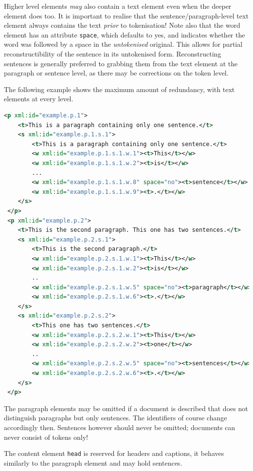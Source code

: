 \documentclass[a4paper,12pt]{report}
\begin{document}
Higher level elements \emph{may} also contain a text element even when the deeper element does too. It is important to realise that the sentence/paragraph-level text element always contains the text \emph{prior} to tokenisation! Note also that the word element has an attribute \texttt{space}, which defaults to yes, and indicates whether the word was followed  by a space in the \emph{untokenised} original. This allows for partial reconstructibility of the sentence in its untokenised form. Reconstructing sentences is generally preferred to grabbing them from the text element at the paragraph or sentence level, as there may be corrections on the token level.

The following example shows the maximum amount of redundancy, with text elements at every level.

\begin{lstlisting}[language=xml]
 <p xml:id="example.p.1">
    <t>This is a paragraph containing only one sentence.</t>
    <s xml:id="example.p.1.s.1">        
        <t>This is a paragraph containing only one sentence.</t>
        <w xml:id="example.p.1.s.1.w.1"><t>This</t></w>
        <w xml:id="example.p.1.s.1.w.2"><t>is</t></w>
        ...
        <w xml:id="example.p.1.s.1.w.8" space="no"><t>sentence</t></w>
        <w xml:id="example.p.1.s.1.w.9"><t>.</t></w>
    </s>
 </p>
 <p xml:id="example.p.2">
    <t>This is the second paragraph. This one has two sentences.</t>
    <s xml:id="example.p.2.s.1">
        <t>This is the second paragraph.</t>
        <w xml:id="example.p.2.s.1.w.1"><t>This</t></w>
        <w xml:id="example.p.2.s.1.w.2"><t>is</t></w>    
        ..
        <w xml:id="example.p.2.s.1.w.5" space="no"><t>paragraph</t></w>    
        <w xml:id="example.p.2.s.1.w.6"><t>.</t></w>    
    </s>
    <s xml:id="example.p.2.s.2">
        <t>This one has two sentences.</t>
        <w xml:id="example.p.2.s.2.w.1"><t>This</t></w>
        <w xml:id="example.p.2.s.2.w.2"><t>one</t></w>    
        ..
        <w xml:id="example.p.2.s.2.w.5" space="no"><t>sentences</t></w>    
        <w xml:id="example.p.2.s.2.w.6"><t>.</t></w>    
    </s>
 </p>
\end{lstlisting}

The paragraph elements may be omitted if a document is described that does not distinguish paragraphs but only sentences. The identifiers of course change accordingly then. Sentences however should never be omitted; documents can never consist of tokens only!

The content element \texttt{head} is reserved for headers and captions, it behaves similarly to the paragraph element and may hold sentences.
\end{document}

